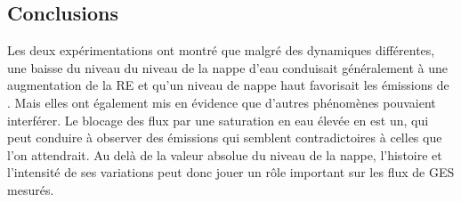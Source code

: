 \subsection{Conclusions}

Les deux expérimentations ont montré que malgré des dynamiques différentes, une baisse du niveau du niveau de la nappe d'eau conduisait généralement à une augmentation de la RE et qu'un niveau de nappe haut favorisait les émissions de \chh.
Mais elles ont également mis en évidence que d'autres phénomènes pouvaient interférer.
Le blocage des flux par une saturation en eau élevée en est un, qui peut conduire à observer des émissions qui semblent contradictoires à celles que l'on attendrait.
Au delà de la valeur absolue du niveau de la nappe, l'histoire et l'intensité de ses variations peut donc jouer un rôle important sur les flux de GES mesurés.
